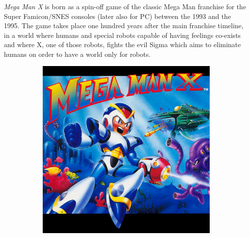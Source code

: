 
\textit{Mega Man X} is born as a spin-off game of the classic Mega Man franchise for the Super Famicon/SNES consoles (later also for PC)  between the 1993 and the 1995\cite{wiki:MMX}. The game takes place one hundred years after the main franchise timeline, in a world where humans and special robots capable of having feelings co-exists and where X, one of those robots, fights the evil Sigma which aims to eliminate humans on order to have a world only for robots.

\begin{figure}[htp]
	\centering
	\begin{subfigure}{0.4\linewidth}
		\centering
		\includegraphics[width=\linewidth]{figures/X1/mmx_cover.jpeg}
	\end{subfigure}
	\begin{subfigure}{0.4\linewidth}
		\centering

\end{subfigure}
\end{figure}
